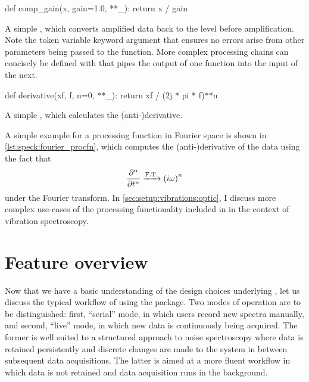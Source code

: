 \begin{marginlisting}
    \begin{pycode}[fontsize=\footnotesize]
        def comp_gain(x, gain=1.0, **_):
            return x / gain
    \end{pycode}
    \caption[Simple  example]{
        A simple , which converts amplified data back to the level before amplification.
        Note the token \code{**_} variable keyword argument that ensures no errors arise from other parameters being passed to the function.
        More complex processing chains can concisely be defined with  that pipes the output of one function into the input of the next.
    }
    \label{lst:speck:procfn}
\end{marginlisting}
\begin{marginlisting}
    \begin{pycode}[fontsize=\footnotesize]
        def derivative(xf, f, n=0, **_):
            return xf / (2j * pi * f)**n
    \end{pycode}
    \caption[Simple  example]{A simple , which calculates the \mbox{(anti-)}derivative.}
    \label{lst:speck:fourier_procfn}
\end{marginlisting}

A simple example for a processing function in Fourier space is shown in \cref{lst:speck:fourier_procfn}, which computes the \mbox{(anti-)}derivative of the data using the fact that
\begin{align}\label{eq:speck:fourier_derivative}
    \pdv[n]{t} \xrightarrow{\mathrm{F.T.}} \left(i\omega\right)^n
\end{align}
under the Fourier transform.
In \cref{sec:setup:vibrations:optic}, I discuss more complex use-cases of the processing functionality included in \pyspeck in the context of vibration spectroscopy.

\section{Feature overview}\label{sec:speck:software:features}
Now that we have a basic understanding of the design choices underlying \pyspeck, let us discuss the typical workflow of using the package.
Two modes of operation are to be distinguished: first, \enquote{serial} mode, in which users record new spectra manually, and second, \enquote{live} mode, in which new data is continuously being acquired.
The former is well suited to a structured approach to noise spectroscopy where data is retained persistently and discrete changes are made to the system in between subsequent data acquisitions.
The latter is aimed at a more fluent workflow in which data is not retained and data acquisition runs in the background.

